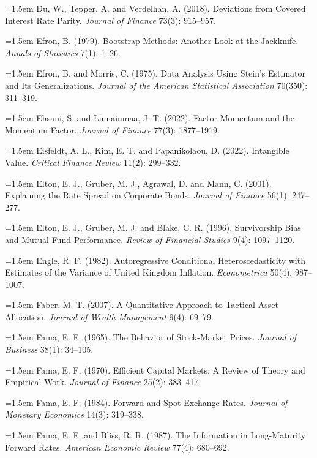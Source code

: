 \hangindent=1.5em Du, W., Tepper, A. and Verdelhan, A. (2018). Deviations from Covered Interest Rate Parity. \emph{Journal of Finance} 73(3): 915--957.

\hangindent=1.5em Efron, B. (1979). Bootstrap Methods: Another Look at the Jackknife. \emph{Annals of Statistics} 7(1): 1--26.

\hangindent=1.5em Efron, B. and Morris, C. (1975). Data Analysis Using Stein's Estimator and Its Generalizations. \emph{Journal of the American Statistical Association} 70(350): 311--319.

\hangindent=1.5em Ehsani, S. and Linnainmaa, J. T. (2022). Factor Momentum and the Momentum Factor. \emph{Journal of Finance} 77(3): 1877--1919.

\hangindent=1.5em Eisfeldt, A. L., Kim, E. T. and Papanikolaou, D. (2022). Intangible Value. \emph{Critical Finance Review} 11(2): 299--332.

\hangindent=1.5em Elton, E. J., Gruber, M. J., Agrawal, D. and Mann, C. (2001). Explaining the Rate Spread on Corporate Bonds. \emph{Journal of Finance} 56(1): 247--277.

\hangindent=1.5em Elton, E. J., Gruber, M. J. and Blake, C. R. (1996). Survivorship Bias and Mutual Fund Performance. \emph{Review of Financial Studies} 9(4): 1097--1120.

\hangindent=1.5em Engle, R. F. (1982). Autoregressive Conditional Heteroscedasticity with Estimates of the Variance of United Kingdom Inflation. \emph{Econometrica} 50(4): 987--1007.

\hangindent=1.5em Faber, M. T. (2007). A Quantitative Approach to Tactical Asset Allocation. \emph{Journal of Wealth Management} 9(4): 69--79.

\hangindent=1.5em Fama, E. F. (1965). The Behavior of Stock-Market Prices. \emph{Journal of Business} 38(1): 34--105.

\hangindent=1.5em Fama, E. F. (1970). Efficient Capital Markets: A Review of Theory and Empirical Work. \emph{Journal of Finance} 25(2): 383--417.

\hangindent=1.5em Fama, E. F. (1984). Forward and Spot Exchange Rates. \emph{Journal of Monetary Economics} 14(3): 319--338.

\hangindent=1.5em Fama, E. F. and Bliss, R. R. (1987). The Information in Long-Maturity Forward Rates. \emph{American Economic Review} 77(4): 680--692.

